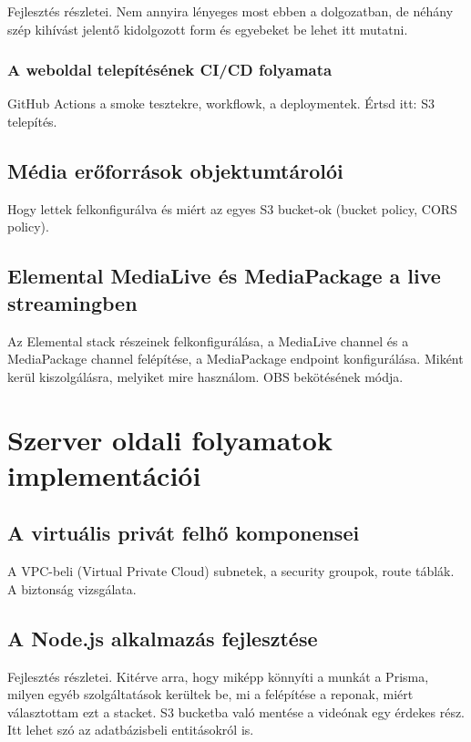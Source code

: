 Fejlesztés részletei. Nem annyira lényeges most ebben a dolgozatban, de néhány szép kihívást jelentő kidolgozott form és egyebeket be lehet itt mutatni.

\subsection{A weboldal telepítésének CI/CD folyamata}

GitHub Actions a smoke tesztekre, workflowk, a deploymentek. Értsd itt: S3 telepítés.

\section{Média erőforrások objektumtárolói}

Hogy lettek felkonfigurálva és miért az egyes S3 bucket-ok (bucket policy, CORS policy).

\section{Elemental MediaLive és MediaPackage a live streamingben}

Az Elemental stack részeinek felkonfigurálása, a MediaLive channel és a MediaPackage channel felépítése, a MediaPackage endpoint konfigurálása. Miként kerül kiszolgálásra, melyiket mire használom. OBS bekötésének módja.

\chapter{Szerver oldali folyamatok implementációi}

\section{A virtuális privát felhő komponensei}

A VPC-beli (Virtual Private Cloud) subnetek, a security groupok, route táblák. A biztonság vizsgálata.

\section{A Node.js alkalmazás fejlesztése}

Fejlesztés részletei. Kitérve arra, hogy miképp könnyíti a munkát a Prisma, milyen egyéb szolgáltatások kerültek be, mi a felépítése a reponak, miért választottam ezt a stacket. S3 bucketba való mentése a videónak egy érdekes rész. Itt lehet szó az adatbázisbeli entitásokról is.

